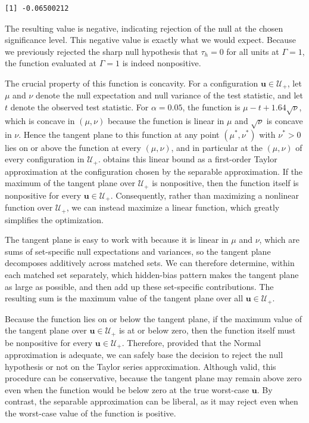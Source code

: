 \documentclass[
  12pt,
  leqno]{article}
\begin{document}
\begin{verbatim}
[1] -0.06500212
\end{verbatim}

\doublespacing

The resulting value is negative, indicating rejection of the null at the
chosen significance level. This negative value is exactly what we would
expect. Because we previously rejected the sharp null hypothesis that
\(\tau_h = 0\) for all units at \(\Gamma = 1\), the function evaluated
at \(\Gamma = 1\) is indeed nonpositive.

The crucial property of this function is concavity. For a configuration
\(\bm{u} \in \mathcal{U}_{+}\), let \(\mu\) and \(\nu\) denote the null
expectation and null variance of the test statistic, and let \(t\)
denote the observed test statistic. For \(\alpha = 0.05\), the function
is \(\mu - t + 1.64\sqrt{\nu}\), which is concave in \((\mu, \nu)\)
because the function is linear in \(\mu\) and \(\sqrt{\nu}\) is concave
in \(\nu\). Hence the tangent plane to this function at any point
\((\mu^{*}, \nu^{*})\) with \(\nu^{*} > 0\) lies on or above the
function at every \((\mu, \nu)\), and in particular at the
\((\mu, \nu)\) of every configuration in \(\mathcal{U}_{+}\).
\citet[pp.~2322--2323]{rosenbaum2018} obtains this linear bound as a
first-order Taylor approximation at the configuration chosen by the
separable approximation. If the maximum of the tangent plane over
\(\mathcal{U}_{+}\) is nonpositive, then the function itself is
nonpositive for every \(\bm{u} \in \mathcal{U}_{+}\). Consequently,
rather than maximizing a nonlinear function over \(\mathcal{U}_{+}\), we
can instead maximize a linear function, which greatly simplifies the
optimization.

The tangent plane is easy to work with because it is linear in \(\mu\)
and \(\nu\), which are sums of set-specific null expectations and
variances, so the tangent plane decomposes additively across matched
sets. We can therefore determine, within each matched set separately,
which hidden-bias pattern makes the tangent plane as large as possible,
and then add up these set-specific contributions. The resulting sum is
the maximum value of the tangent plane over all
\(\bm{u} \in \mathcal{U}_{+}\).

Because the function lies on or below the tangent plane, if the maximum
value of the tangent plane over \(\bm{u} \in \mathcal{U}_{+}\) is at or
below zero, then the function itself must be nonpositive for every
\(\bm{u} \in \mathcal{U}_{+}\). Therefore, provided that the Normal
approximation is adequate, we can safely base the decision to reject the
null hypothesis or not on the Taylor series approximation. Although
valid, this procedure can be conservative, because the tangent plane may
remain above zero even when the function would be below zero at the true
worst-case \(\bm{u}\). By contrast, the separable approximation can be
liberal, as it may reject even when the worst-case value of the function
is positive.
\end{document}
